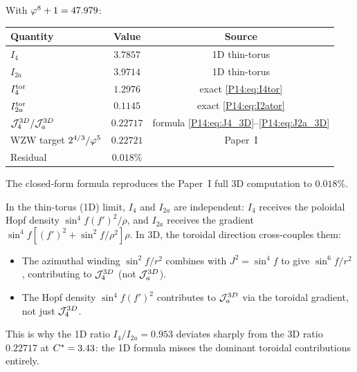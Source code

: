 \begin{remark}[Numerical verification at $\Cstar=3.4318$, $\Rzero=3$]
\label{P14:rem:formula_check}
With $\varphi^8+1=47.979$:
\begin{center}
\begin{tabular}{lcc}
\toprule
Quantity & Value & Source \\
\midrule
$I_4$ & $3.7857$ & 1D thin-torus \\
$I_{2a}$ & $3.9714$ & 1D thin-torus \\
$I_{4}^{\mathrm{tor}}$ & $1.2976$ & exact \eqref{P14:eq:I4tor} \\
$I_{2a}^{\mathrm{tor}}$ & $0.1145$ & exact \eqref{P14:eq:I2ator} \\
$\mathcal{J}_4^{3D}/\mathcal{J}_a^{3D}$ & $0.22717$ & formula \eqref{P14:eq:J4_3D}--\eqref{P14:eq:J2a_3D} \\
WZW target $2^{4/3}/\varphi^5$ & $0.22721$ & Paper~I \\
Residual & $0.018\%$ & \\
\bottomrule
\end{tabular}
\end{center}
The closed-form formula reproduces the Paper~I full 3D computation to $0.018\%$.
\end{remark}

\begin{remark}
\label{P14:rem:cross_coupling}
In the thin-torus (1D) limit, $I_4$ and $I_{2a}$ are independent:
$I_4$ receives the poloidal Hopf density $\sin^4\!f(f')^2/\rho$, and
$I_{2a}$ receives the gradient $\sin^4\!f[(f')^2+\sin^2\!f/\rho^2]\rho$.
In 3D, the toroidal direction cross-couples them:
\begin{itemize}[noitemsep]
\item The azimuthal winding $\sin^2\!f/r^2$ combines with $J^2=\sin^4\!f$
  to give $\sin^6\!f/r^2$, contributing to $\mathcal{J}_4^{3D}$ (not $\mathcal{J}_a^{3D}$).
\item The Hopf density $\sin^4\!f(f')^2$ contributes to $\mathcal{J}_a^{3D}$ via
  the toroidal gradient, not just $\mathcal{J}_4^{3D}$.
\end{itemize}
This is why the 1D ratio $I_4/I_{2a}=0.953$ deviates sharply from the
3D ratio $0.22717$ at $C^*=3.43$: the 1D formula misses the dominant
toroidal contributions entirely.
\end{remark}

